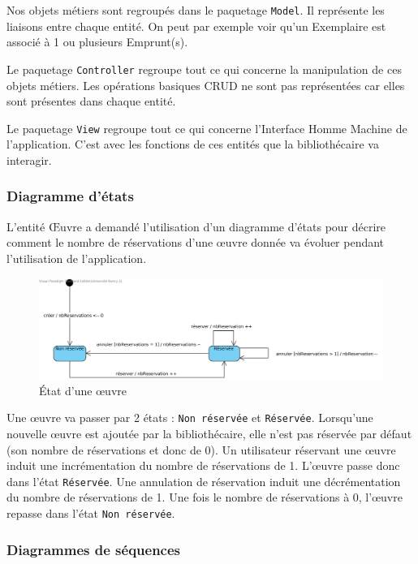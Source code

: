 \documentclass[a4paper,12pt]{article}
\begin{document}
Nos objets métiers sont regroupés dans le paquetage \texttt{Model}. Il représente les
liaisons entre chaque entité. On peut par exemple voir qu’un Exemplaire est
associé à 1 ou plusieurs Emprunt(s).

Le paquetage \texttt{Controller} regroupe tout ce qui concerne la manipulation de ces
objets métiers. Les opérations basiques CRUD ne sont pas représentées car
elles sont présentes dans chaque entité.

Le paquetage \texttt{View} regroupe tout ce qui concerne l’Interface Homme Machine de
l’application. C’est avec les fonctions de ces entités que la bibliothécaire
va interagir.

\clearpage

\subsubsection{Diagramme d’états}
\label{sec:orgheadline8}

L’entité Œuvre a demandé l’utilisation d’un diagramme d’états pour décrire
comment le nombre de réservations d’une œuvre donnée va évoluer pendant
l’utilisation de l’application.


\begin{figure}[htb]
\centering
\includegraphics[width=.9\linewidth]{./res/img/oeuvre.png}
\caption{\label{fig:orgparagraph4}
État d'une œuvre}
\end{figure}


Une œuvre va passer par 2 états : \texttt{Non réservée} et \texttt{Réservée}. Lorsqu’une
nouvelle œuvre est ajoutée par la bibliothécaire, elle n’est pas réservée
par défaut (son nombre de réservations et donc de 0).
Un utilisateur réservant une œuvre induit une incrémentation du nombre de réservations de 1.
L’œuvre passe donc dans l’état \texttt{Réservée}.
Une annulation de réservation induit une décrémentation du nombre de réservations de 1.
Une fois le nombre de réservations à 0, l’œuvre repasse dans l’état \texttt{Non réservée}.

\subsubsection{Diagrammes de séquences}
\label{sec:orgheadline11}
\end{document}
